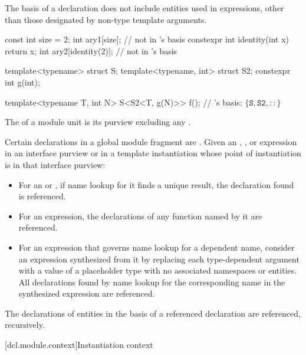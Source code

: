 \begin{std.txt}
\alinea
\begin{note}
The basis of a declaration
does not include entities used in expressions,
other than those designated by non-type template arguments.
\begin{example}
\begin{codeblock}
const int size = 2;
int ary1[size];                         //  not in 's basis
constexpr int identity(int x) { return x; }
int ary2[identity(2)];                  //  not in 's basis

template<typename> struct S;
template<typename, int> struct S2;
constexpr int g(int);

template<typename T, int N>
S<S2<T, g(N)>> f();                     // 's basis: $\{ \mathtt{S}, \mathtt{S2}, \mathtt{::} \}$ 
\end{codeblock}
\end{example}
\end{note}

\alinea
The  of a module unit
is its purview excluding any .

\alinea
Certain declarations in a global module fragment are .
Given an
,
,
or expression
in an interface purview or
in a template instantiation whose point of instantiation is in that interface purview:
\begin{itemize}
\item
For an  or ,
if name lookup for it finds a unique result,
the declaration found is referenced.
\item
For an expression,
the declarations of any function named by it are referenced.
\item
For an expression that governs name lookup for a dependent name,
consider an expression synthesized from it
by replacing each type-dependent argument
with a value of a placeholder type
with no associated namespaces or entities.
All declarations found by name lookup
for the corresponding name
in the synthesized expression are referenced.
\end{itemize}
The declarations of entities in the basis of a referenced declaration are referenced, recursively.
\end{std.txt}

[dcl.module.context]{Instantiation context}

